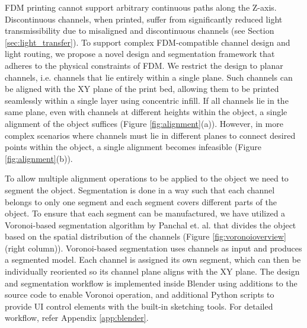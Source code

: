 FDM printing cannot support arbitrary continuous paths along the Z-axis. Discontinuous channels, when printed, suffer from significantly reduced light transmissibility due to misaligned and discontinuous channels (see Section \ref{sec:light_transfer}). To support complex FDM-compatible channel design and light routing, we propose a novel design and segmentation framework that adheres to the physical constraints of FDM. We restrict the design to planar channels, i.e. channels that lie entirely within a single plane. Such channels can be aligned with the XY plane of the print bed, allowing them to be printed seamlessly within a single layer using concentric infill. If all channels lie in the same plane, even with channels at different heights within the object, a single alignment of the object suffices (Figure \ref{fig:alignment}(a)). However, in more complex scenarios where channels must lie in different planes to connect desired points within the object, a single alignment becomes infeasible (Figure \ref{fig:alignment}(b)).

To allow multiple alignment operations to be applied to the object we need to segment the object. Segmentation is done in a way such that each channel belongs to only one segment and each segment covers different parts of the object. To ensure that each segment can be manufactured, we have utilized a Voronoi-based segmentation algorithm by Panchal et. al. \cite{panchal2023curvedspacefillingtilesusing} that divides the object based on the spatial distribution of the channels (Figure \ref{fig:voronoioverview} (right column)). 
Voronoi-based segmentation uses channels as input and produces a segmented model. Each channel is assigned its own segment, which can then be individually reoriented so its channel plane aligns with the XY plane. The design and segmentation workflow is implemented inside Blender using additions to the source code to enable Voronoi operation, and additional Python scripts to provide UI control elements with the built-in sketching tools. For detailed workflow, refer Appendix \ref{app:blender}.


